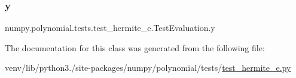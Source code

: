 \subsubsection{\texorpdfstring{y}{y}}
{\footnotesize\ttfamily numpy.\+polynomial.\+tests.\+test\+\_\+hermite\+\_\+e.\+Test\+Evaluation.\+y\hspace{0.3cm}{\ttfamily [static]}}



The documentation for this class was generated from the following file\+:\begin{DoxyCompactItemize}
\item 
venv/lib/python3./site-\/packages/numpy/polynomial/tests/\hyperlink{test__hermite__e_8py}{test\+\_\+hermite\+\_\+e.\+py}\end{DoxyCompactItemize}
